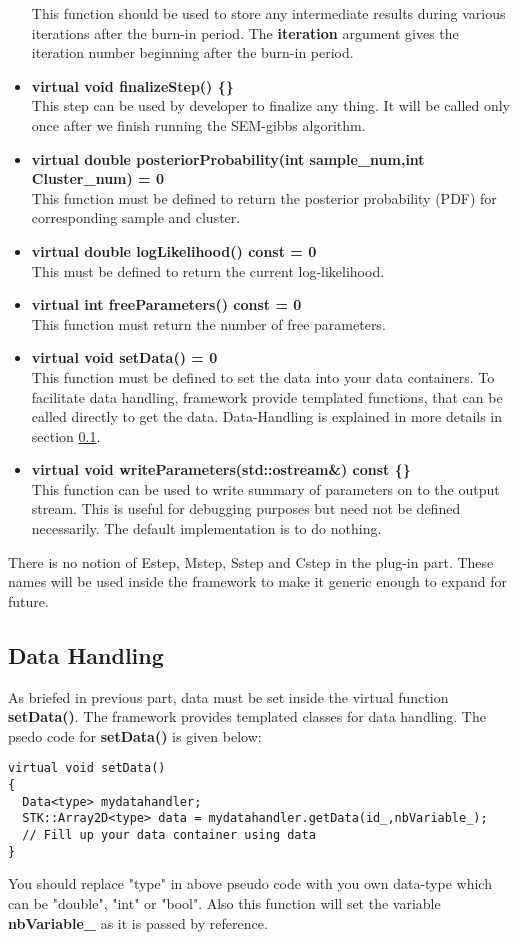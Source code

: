 \documentclass[a4paper,11pt]{article}
\begin{document}
\begin{itemize}
This function should be used to store any intermediate results during various iterations after the burn-in period. The {\bf iteration} argument gives the 
iteration number beginning after the burn-in period.
\item {\bf virtual void finalizeStep() \{\}}\\
This step can be used by developer to finalize any thing. It will be called only once after we
finish running the SEM-gibbs algorithm.
\item {\bf virtual double posteriorProbability(int sample\_num,int Cluster\_num) = 0}\\
This function must be defined to return the posterior probability (PDF) for corresponding sample and cluster.
\item {\bf virtual double logLikelihood() const = 0}\\
This must be defined to return the current log-likelihood.
\item {\bf virtual int freeParameters() const = 0}\\
This function must return the number of free parameters.
\item {\bf virtual void setData() = 0}\\
This function must be defined to set the data into your data containers. To facilitate data handling, framework provide templated functions,
that can be called directly to get the data. Data-Handling is explained in more details in section \ref{datahandling}.
\item {\bf virtual void writeParameters(std::ostream\&) const \{\}}\\
This function can be used to write summary of parameters on to the output stream. This is useful for debugging purposes but need not be defined necessarily. The
default implementation is to do nothing.
\end{itemize}

There is no notion of Estep, Mstep, Sstep and Cstep in the plug-in part. These names will be used inside the framework to make
it generic enough to expand for future. 

\subsection{Data Handling}
\label{datahandling}
As briefed in previous part, data must be set inside the virtual function {\bf setData()}. The framework provides templated classes for data handling. The 
psedo code for {\bf setData()} is given below:
\begin{lstlisting}
virtual void setData()
{
  Data<type> mydatahandler;
  STK::Array2D<type> data = mydatahandler.getData(id_,nbVariable_);
  // Fill up your data container using data 
}
\end{lstlisting}
You should replace "type" in above pseudo code with you own data-type which can be {"double", "int" or "bool"}. Also this function will set 
the variable {\bf nbVariable\_} as it is passed by reference.
\end{document}
